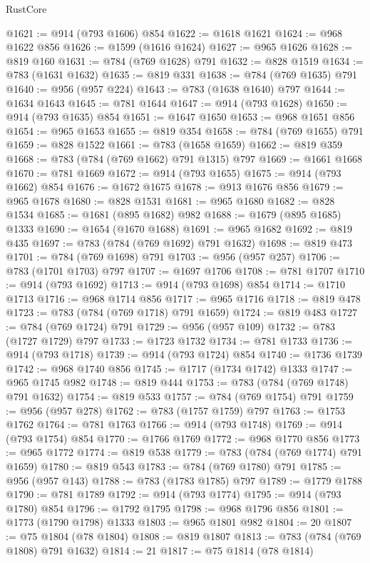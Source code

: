 \begin{lexlean}{RustCore}
\begin{coremodule}
@1621 := @914 (@793 @1606) @854
@1622 := @1618 @1621
@1624 := @968 @1622 @856
@1626 := @1599 (@1616 @1624)
@1627 := @965 @1626
@1628 := @819 @160
@1631 := @784 (@769 @1628) @791
@1632 := @828 @1519
@1634 := @783 (@1631 @1632)
@1635 := @819 @331
@1638 := @784 (@769 @1635) @791
@1640 := @956 (@957 @224)
@1643 := @783 (@1638 @1640) @797
@1644 := @1634 @1643
@1645 := @781 @1644
@1647 := @914 (@793 @1628)
@1650 := @914 (@793 @1635) @854
@1651 := @1647 @1650
@1653 := @968 @1651 @856
@1654 := @965 @1653
@1655 := @819 @354
@1658 := @784 (@769 @1655) @791
@1659 := @828 @1522
@1661 := @783 (@1658 @1659)
@1662 := @819 @359
@1668 := @783 (@784 (@769 @1662) @791 @1315) @797
@1669 := @1661 @1668
@1670 := @781 @1669
@1672 := @914 (@793 @1655)
@1675 := @914 (@793 @1662) @854
@1676 := @1672 @1675
@1678 := @913 @1676 @856
@1679 := @965 @1678
@1680 := @828 @1531
@1681 := @965 @1680
@1682 := @828 @1534
@1685 := @1681 (@895 @1682) @982
@1688 := @1679 (@895 @1685) @1333
@1690 := @1654 (@1670 @1688)
@1691 := @965 @1682
@1692 := @819 @435
@1697 := @783 (@784 (@769 @1692) @791 @1632)
@1698 := @819 @473
@1701 := @784 (@769 @1698) @791
@1703 := @956 (@957 @257)
@1706 := @783 (@1701 @1703) @797
@1707 := @1697 @1706
@1708 := @781 @1707
@1710 := @914 (@793 @1692)
@1713 := @914 (@793 @1698) @854
@1714 := @1710 @1713
@1716 := @968 @1714 @856
@1717 := @965 @1716
@1718 := @819 @478
@1723 := @783 (@784 (@769 @1718) @791 @1659)
@1724 := @819 @483
@1727 := @784 (@769 @1724) @791
@1729 := @956 (@957 @109)
@1732 := @783 (@1727 @1729) @797
@1733 := @1723 @1732
@1734 := @781 @1733
@1736 := @914 (@793 @1718)
@1739 := @914 (@793 @1724) @854
@1740 := @1736 @1739
@1742 := @968 @1740 @856
@1745 := @1717 (@1734 @1742) @1333
@1747 := @965 @1745 @982
@1748 := @819 @444
@1753 := @783 (@784 (@769 @1748) @791 @1632)
@1754 := @819 @533
@1757 := @784 (@769 @1754) @791
@1759 := @956 (@957 @278)
@1762 := @783 (@1757 @1759) @797
@1763 := @1753 @1762
@1764 := @781 @1763
@1766 := @914 (@793 @1748)
@1769 := @914 (@793 @1754) @854
@1770 := @1766 @1769
@1772 := @968 @1770 @856
@1773 := @965 @1772
@1774 := @819 @538
@1779 := @783 (@784 (@769 @1774) @791 @1659)
@1780 := @819 @543
@1783 := @784 (@769 @1780) @791
@1785 := @956 (@957 @143)
@1788 := @783 (@1783 @1785) @797
@1789 := @1779 @1788
@1790 := @781 @1789
@1792 := @914 (@793 @1774)
@1795 := @914 (@793 @1780) @854
@1796 := @1792 @1795
@1798 := @968 @1796 @856
@1801 := @1773 (@1790 @1798) @1333
@1803 := @965 @1801 @982
@1804 := 20
@1807 := @75 @1804 (@78 @1804)
@1808 := @819 @1807
@1813 := @783 (@784 (@769 @1808) @791 @1632)
@1814 := 21
@1817 := @75 @1814 (@78 @1814)

\end{coremodule}
\end{lexlean}

